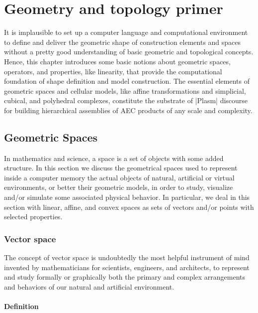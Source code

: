 
\chapter{Geometry and topology primer}
\label{chapt:3}

It is implausible to set up a computer language and computational environment to define and deliver the geometric shape of construction elements and spaces without a pretty good understanding of basic geometric and topological concepts. Hence, this chapter introduces some basic notions about geometric spaces, operators, and properties, like linearity, that provide the computational foundation of shape definition and model construction.
The essential elements of geometric spaces and cellular models, like affine transformations and simplicial, cubical, and polyhedral complexes, constitute the substrate of |Plasm| discourse for building hierarchical assemblies of AEC products of any scale and complexity.

\section{Geometric Spaces}\label{}


In mathematics and science, a space is a set of objects with some added structure.
In this section we discuss the geometrical spaces used to represent inside a computer memory the actual objects of natural, artificial or virtual environments, or better their geometric models, in order to study, visualize and/or simulate some associated physical behavior. 
In particular, we deal in this section with linear, affine, and convex spaces as sets of vectors and/or points with selected properties.

\subsection{Vector space}
\label{subsec:2:style}

The concept of vector space is undoubtedly the most helpful instrument of mind invented by mathematicians for scientists, engineers, and architects, to represent and study formally or graphically both the primary and complex arrangements and behaviors of our natural and artificial environment.

\subsubsection*{Definition}

